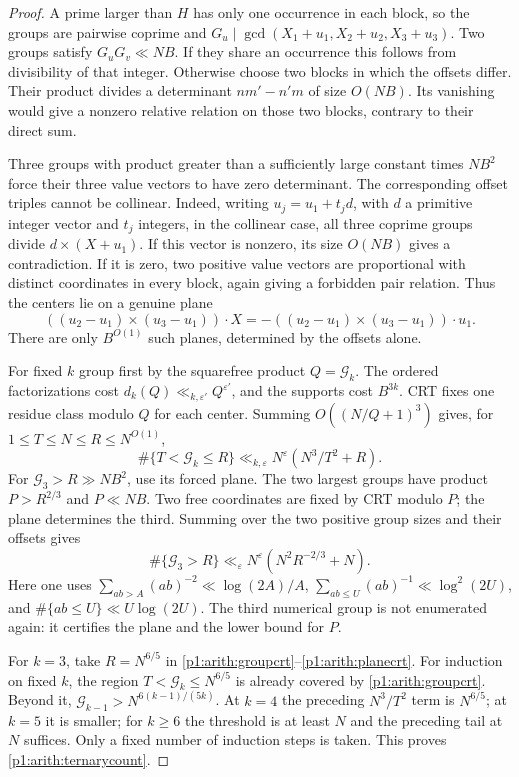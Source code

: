 \begin{proof}
A prime larger than $H$ has only one occurrence in each block, so the
groups are pairwise coprime and
$G_u\mid\gcd(X_1+u_1,X_2+u_2,X_3+u_3)$.
Two groups satisfy $G_uG_v\ll NB$.
If they share an occurrence this follows from divisibility of that
integer.  Otherwise choose two blocks in which the offsets differ.
Their product divides a determinant $nm'-n'm$ of size $O(NB)$.
Its vanishing would give a nonzero relative relation on those two
blocks, contrary to their direct sum.

Three groups with product greater than a sufficiently large constant
times $NB^2$ force their three value vectors to have zero determinant.
The corresponding offset triples cannot be collinear.  Indeed, writing
$u_j=u_1+t_jd$, with $d$ a primitive integer vector and $t_j$ integers,
in the collinear case, all three coprime groups divide
$d\times(X+u_1)$.  If this vector is nonzero, its size $O(NB)$ gives a
contradiction.  If it is zero, two positive value vectors are proportional
with distinct coordinates in every block, again giving a forbidden pair
relation.  Thus the centers lie on a genuine plane
\[
 ((u_2-u_1)\times(u_3-u_1))\cdot X
 =-((u_2-u_1)\times(u_3-u_1))\cdot u_1.
\]
There are only $B^{O(1)}$ such planes, determined by the offsets alone.

For fixed $k$ group first by the squarefree product $Q=\mathcal G_k$.
The ordered factorizations cost $d_k(Q)\ll_{k,\varepsilon'}Q^{\varepsilon'}$,
and the supports cost $B^{3k}$.  CRT fixes one residue class modulo $Q$
for each center.  Summing $O((N/Q+1)^3)$ gives, for
$1\leq T\leq N\leq R\leq N^{O(1)}$,
\begin{equation}\label{p1:arith:groupcrt}
 \#\{T<\mathcal G_k\leq R\}
 \ll_{k,\varepsilon}N^\varepsilon(N^3/T^2+R).
\end{equation}
For $\mathcal G_3>R\gg NB^2$, use its forced plane.  The two largest
groups have product $P>R^{2/3}$ and $P\ll NB$.  Two free coordinates
are fixed by CRT modulo $P$; the plane determines the third.
Summing over the two positive group sizes and their offsets gives
\begin{equation}\label{p1:arith:planecrt}
 \#\{\mathcal G_3>R\}
 \ll_\varepsilon N^\varepsilon(N^2R^{-2/3}+N).
\end{equation}
Here one uses
$\sum_{ab>A}(ab)^{-2}\ll\log(2A)/A$,
$\sum_{ab\leq U}(ab)^{-1}\ll\log^2(2U)$, and
$\#\{ab\leq U\}\ll U\log(2U)$.
The third numerical group is not enumerated again: it certifies the
plane and the lower bound for $P$.

For $k=3$, take $R=N^{6/5}$ in
\eqref{p1:arith:groupcrt}--\eqref{p1:arith:planecrt}.
For induction on fixed $k$, the region
$T<\mathcal G_k\leq N^{6/5}$ is already covered by
\eqref{p1:arith:groupcrt}.  Beyond it,
$\mathcal G_{k-1}>N^{6(k-1)/(5k)}$.
At $k=4$ the preceding $N^3/T^2$ term is $N^{6/5}$; at $k=5$
it is smaller; for $k\geq6$ the threshold is at least $N$ and the
preceding tail at $N$ suffices.  Only a fixed number of induction steps
is taken.  This proves \eqref{p1:arith:ternarycount}.
\end{proof}

